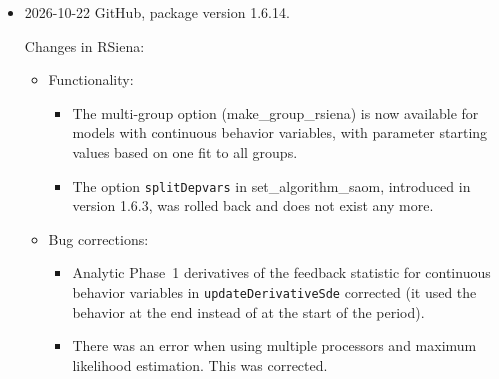 \documentclass[a4paper,fleqn,11pt]{article}
\newcommand{\+}{\, + \,}
\newcommand{\sfn}[1]{\textsf{#1}}
\begin{document}
\begin{small}
\begin{itemize} %

\item 2026-10-22 GitHub, package version 1.6.14.

Changes in RSiena:
\begin{itemize}
  \item Functionality:
     \begin{itemize}
  \item The multi-group option (\sfn{make\_group\_rsiena}) is now available
    for models with continuous behavior variables, with parameter starting values
    based on one fit to all groups.
  \item The option \texttt{splitDepvars} in \sfn{set\_algorithm\_saom}, 
    introduced in version 1.6.3,
    was rolled back and does not exist any more.
    \end{itemize}
  \item Bug corrections:
    \begin{itemize}
  \item Analytic Phase~1 derivatives of the feedback statistic for continuous
    behavior variables in \texttt{updateDerivativeSde} corrected (it used the
    behavior at the end instead of at the start of the period).
    \item There was an error when using multiple processors and maximum likelihood
    estimation. This was corrected.
    \end{itemize}
\end{itemize}


\end{itemize}
\end{small}
\end{document}
